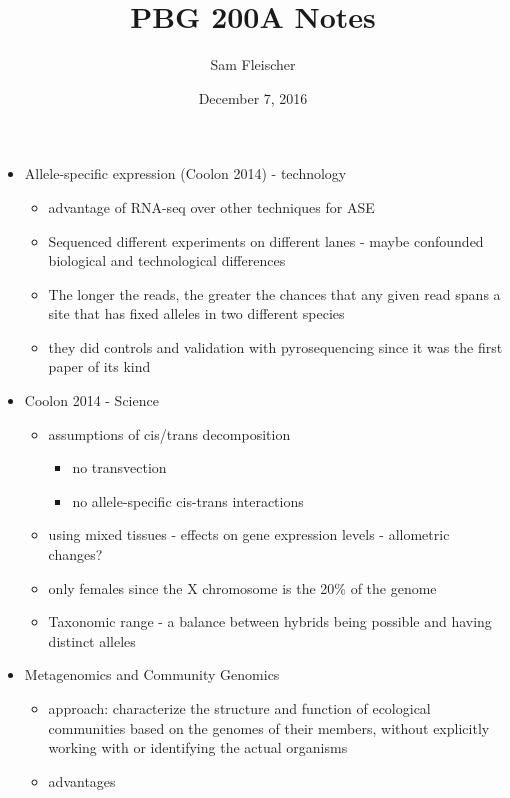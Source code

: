 \documentclass{article}
\title{PBG 200A Notes}
\author{Sam Fleischer}
\date{December 7, 2016}
\begin{document}
    \maketitle

    \begin{itemize}
        \item Allele-specific expression (Coolon 2014) - technology
        \begin{itemize}
            \item advantage of RNA-seq over other techniques for ASE
            \item Sequenced different experiments on different lanes - maybe confounded biological and technological differences
            \item The longer the reads, the greater the chances that any given read spans a site that has fixed alleles in two different species
            \item they did controls and validation with pyrosequencing since it was the first paper of its kind
        \end{itemize}
        \item Coolon 2014 - Science
        \begin{itemize}
            \item assumptions of cis/trans decomposition
            \begin{itemize}
                \item no transvection
                \item no allele-specific cis-trans interactions
            \end{itemize}
            \item using mixed tissues - effects on gene expression levels - allometric changes?
            \item only females since the X chromosome is the 20\% of the genome
            \item Taxonomic range - a balance between hybrids being possible and having distinct alleles
        \end{itemize}
        \item Metagenomics and Community Genomics
        \begin{itemize}
            \item approach: characterize the structure and function of ecological communities based on the genomes of their members, without explicitly working with or identifying the actual organisms
            \item advantages

\end{itemize}
\end{itemize}
\end{document}
